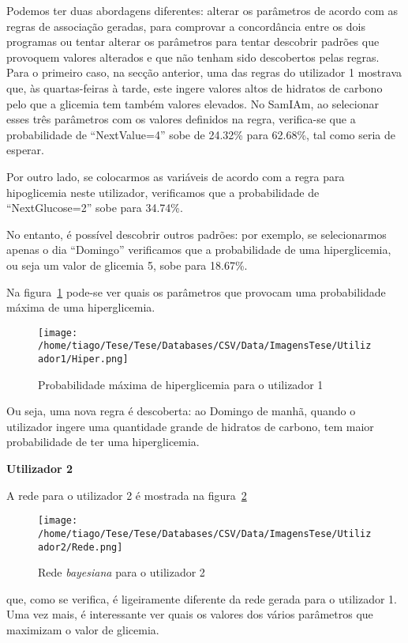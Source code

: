 Podemos ter duas abordagens diferentes: alterar os parâmetros de acordo com as regras de associação geradas, para comprovar a concordância entre os dois programas ou tentar alterar os parâmetros para tentar descobrir padrões que provoquem valores alterados e que não tenham sido descobertos pelas regras. 
Para o primeiro caso, na secção anterior, uma das regras do utilizador 1 mostrava que, às quartas-feiras à tarde, este ingere valores altos de hidratos de carbono pelo que a glicemia tem também valores elevados. No SamIAm, ao selecionar esses três parâmetros com os valores definidos na regra, verifica-se que a probabilidade de ``Next\textunderscore Value=4'' sobe de 24.32\% para 62.68\%, tal como seria de esperar.

Por outro lado, se colocarmos as variáveis de acordo com a regra para hipoglicemia neste utilizador, verificamos que a probabilidade de ``Next\textunderscore Glucose=2'' sobe para 34.74\%.

No entanto, é possível descobrir outros padrões: por exemplo, se selecionarmos apenas o dia ``Domingo'' verificamos que a probabilidade de uma hiperglicemia, ou seja um valor de glicemia 5, sobe para 18.67\%. 

Na figura~\ref{fig:hiper1} pode-se ver quais os parâmetros que provocam uma probabilidade máxima de uma hiperglicemia.

\begin{figure}[H]
\centering
\texttt{[image: /home/tiago/Tese/Tese/Databases/CSV/Data/ImagensTese/Utilizador1/Hiper.png]}
\caption{Probabilidade máxima de hiperglicemia para o utilizador 1}
\label{fig:hiper1}
\end{figure}
Ou seja, uma nova regra é descoberta: ao Domingo de manhã, quando o utilizador ingere uma quantidade grande de hidratos de carbono, tem maior probabilidade de ter uma hiperglicemia. 

\textbf{Utilizador 2}


A rede para o utilizador 2 é mostrada na figura~\ref{fig:sam2}

\begin{figure}[H]
\centering
\texttt{[image: /home/tiago/Tese/Tese/Databases/CSV/Data/ImagensTese/Utilizador2/Rede.png]}
\caption{Rede \textit{bayesiana} para o utilizador 2}
\label{fig:sam2}
\end{figure}
que, como se verifica, é ligeiramente diferente da rede gerada para o utilizador 1. Uma vez mais, é interessante ver quais os valores dos vários parâmetros que maximizam o valor de glicemia. 

